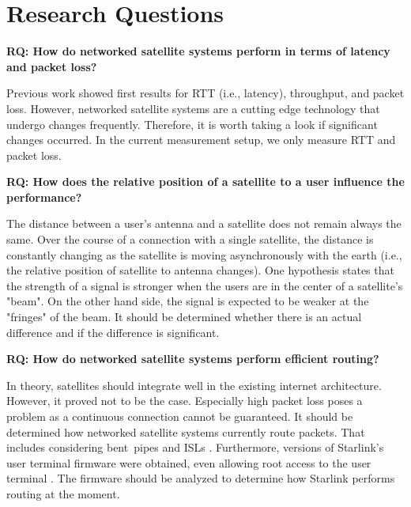 \section{Research Questions} \label{sec:research-questions}

\begin{mdframed}
	\textbf{RQ: How do networked satellite systems perform in terms of latency and packet loss?}
\end{mdframed}

Previous work \cite{DBLP:conf/imc/MichelTGB22, DBLP:conf/infocom/MaCZCML23, Segan2020} showed first results for \ac{RTT} (i.e., latency), throughput, and packet loss. However, networked satellite systems are a cutting edge technology that undergo changes frequently. Therefore, it is worth taking a look if significant changes occurred. In the current measurement setup, we only measure \ac{RTT} and packet loss.

\begin{mdframed}
	\textbf{RQ: How does the relative position of a satellite to a user influence the performance?}
\end{mdframed}

The distance between a user's antenna and a satellite does not remain always the same. Over the course of a connection with a single satellite, the distance is constantly changing as the satellite is moving asynchronously with the earth (i.e., the relative position of satellite to antenna changes).
One hypothesis states that the strength of a signal is stronger when the users are in the center of a satellite's "beam".
On the other hand side, the signal is expected to be weaker at the "fringes" of the beam. It should be determined whether there is an actual difference and if the difference is significant.

\begin{mdframed}
	\textbf{RQ: How do networked satellite systems perform efficient routing?}
\end{mdframed}

In theory, satellites should integrate well in the existing internet architecture. However, it proved not to be the case. Especially high packet loss \cite{DBLP:conf/infocom/MaCZCML23} poses a problem as a continuous connection cannot be guaranteed.
It should be determined how networked satellite systems currently route packets. That includes considering bent~pipes and ISLs \cite{Hauri2020}.
Furthermore, versions of Starlink's user terminal firmware were obtained, even allowing root access to the user terminal \cite{QuarkslabsBlogUserTerminalFirmsware, WoutersDumpingUserTerminalFirmware}.
The firmware should be analyzed to determine how Starlink performs routing at the moment.
